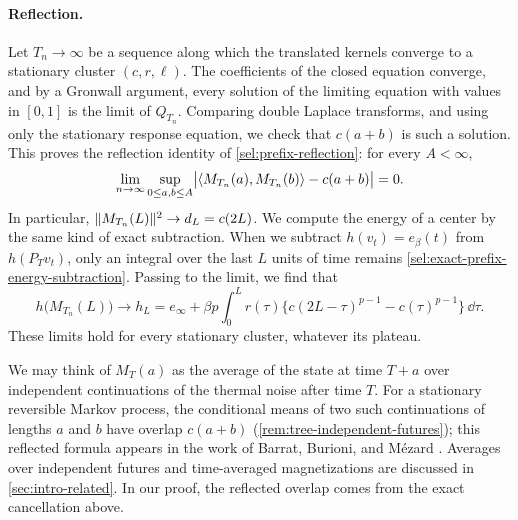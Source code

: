 \paragraph{Reflection.}
Let $T_n\to\infty$ be a sequence along which the translated kernels converge to a stationary cluster $(c,r,\ell)$. The coefficients of the closed equation converge, and by a Gronwall argument, every solution of the limiting equation with values in $[0,1]$ is the limit of $Q_{T_n}$. Comparing double Laplace transforms, and using only the stationary response equation, we check that $c(a+b)$ is such a solution. This proves the reflection identity of \cref{sel:prefix-reflection}: for every $A<\infty$,
\begin{equation}\label{eq:overview-reflection}
 \lim_{n\to\infty}\sup_{0\le a,b\le A}\bigl|\left\langle M_{T_n}(a),M_{T_n}(b)\right\rangle-c(a+b)\bigr|=0 .
\end{equation}
In particular, $\lVert M_{T_n}(L)\rVert^2\to d_L=c(2L)$. We compute the energy of a center by the same kind of exact subtraction. When we subtract $h(v_t)=e_\beta(t)$ from $h(P_Tv_t)$, only an integral over the last $L$ units of time remains \eqref{sel:exact-prefix-energy-subtraction}. Passing to the limit, we find that
\begin{equation}\label{eq:overview-center-energy}
 h\bigl(M_{T_n}(L)\bigr)\longrightarrow
 h_L=e_\infty+\beta p\int_0^Lr(\tau)\bigl\{c(2L-\tau)^{p-1}-c(\tau)^{p-1}\bigr\}\,\dd\tau .
\end{equation}
These limits hold for every stationary cluster, whatever its plateau.

We may think of $M_T(a)$ as the average of the state at time $T+a$ over independent continuations of the thermal noise after time $T$. For a stationary reversible Markov process, the conditional means of two such continuations of lengths $a$ and $b$ have overlap $c(a+b)$ (\cref{rem:tree-independent-futures}); this reflected formula appears in the work of Barrat, Burioni, and M\'ezard \cite[Section~2, Equation~(9)]{bbm1996}. Averages over independent futures and time-averaged magnetizations \cite{cugliandolodean1995,franzvirasoro2000,biroli1999,ck1994} are discussed in \cref{sec:intro-related}. In our proof, the reflected overlap comes from the exact cancellation above.

